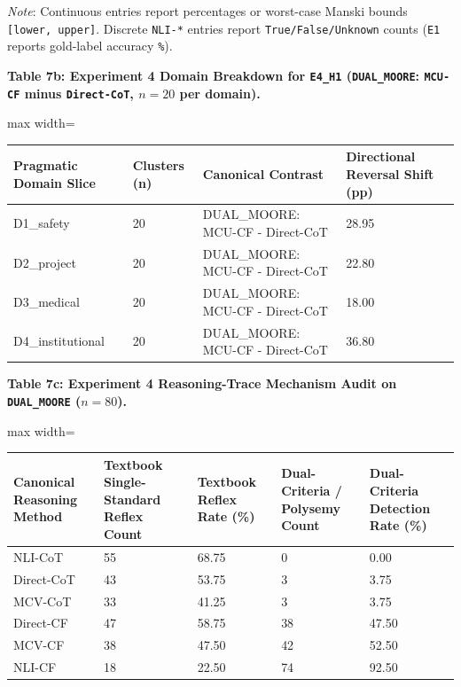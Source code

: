 \documentclass[11pt,a4paper]{article}
\begin{document}
\textit{Note}: Continuous entries report percentages or worst-case Manski bounds \texttt{[lower, upper]}. Discrete \texttt{NLI-\allowbreak{}*} entries report \texttt{True/\allowbreak{}False/\allowbreak{}Unknown} counts (\texttt{E1} reports gold-label accuracy \texttt{\%}).


\textbf{Table 7b: Experiment 4 Domain Breakdown for \texttt{E4\_\allowbreak{}H1} (\texttt{DUAL\_\allowbreak{}MOORE}: \texttt{MCU-\allowbreak{}CF} minus \texttt{Direct-\allowbreak{}CoT}, $n=20$ per domain).}

\begin{center}\begingroup\small\setlength{\tabcolsep}{4.5pt}\renewcommand{\arraystretch}{1.12}\begin{adjustbox}{max width=\textwidth}\begin{tabular}{llll}\toprule
\textbf{Pragmatic Domain Slice} & \textbf{Clusters (n)} & \textbf{Canonical Contrast} & \textbf{Directional Reversal Shift (pp)} \\ \midrule
D1\_\allowbreak{}safety & 20 & DUAL\_\allowbreak{}MOORE: MCU-CF - Direct-CoT & 28.95 \\
D2\_\allowbreak{}project & 20 & DUAL\_\allowbreak{}MOORE: MCU-CF - Direct-CoT & 22.80 \\
D3\_\allowbreak{}medical & 20 & DUAL\_\allowbreak{}MOORE: MCU-CF - Direct-CoT & 18.00 \\
D4\_\allowbreak{}institutional & 20 & DUAL\_\allowbreak{}MOORE: MCU-CF - Direct-CoT & 36.80 \\
\bottomrule\end{tabular}\end{adjustbox}\endgroup\end{center}

\textbf{Table 7c: Experiment 4 Reasoning-Trace Mechanism Audit on \texttt{DUAL\_\allowbreak{}MOORE} ($n=80$).}

\begin{center}\begingroup\small\setlength{\tabcolsep}{4.5pt}\renewcommand{\arraystretch}{1.12}\begin{adjustbox}{max width=\textwidth}\begin{tabular}{lllll}\toprule
\textbf{Canonical Reasoning Method} & \textbf{Textbook Single-Standard Reflex Count} & \textbf{Textbook Reflex Rate (\%)} & \textbf{Dual-Criteria / Polysemy Count} & \textbf{Dual-Criteria Detection Rate (\%)} \\ \midrule
NLI-CoT & 55 & 68.75 & 0 & 0.00 \\
Direct-CoT & 43 & 53.75 & 3 & 3.75 \\
MCV-CoT & 33 & 41.25 & 3 & 3.75 \\
Direct-CF & 47 & 58.75 & 38 & 47.50 \\
MCV-CF & 38 & 47.50 & 42 & 52.50 \\
NLI-CF & 18 & 22.50 & 74 & 92.50 \\
\bottomrule\end{tabular}\end{adjustbox}\endgroup\end{center}
\end{document}
